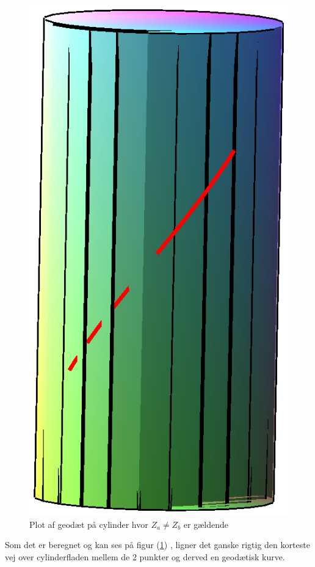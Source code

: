 \begin{figure}\label{eq:GeoPlot1}
\center
\includegraphics[scale=0.4]{pictures/Opg8_Fig1.eps}  
\caption{Plot af geodæt på cylinder hvor $Z_a\neq Z_b$ er gældende }
\end{figure}
Som det er beregnet og kan ses på figur  (\ref{eq:GeoPlot1}) , ligner det ganske rigtig den korteste vej over cylinderfladen mellem de 2 punkter og derved en geodætisk kurve.
\\
